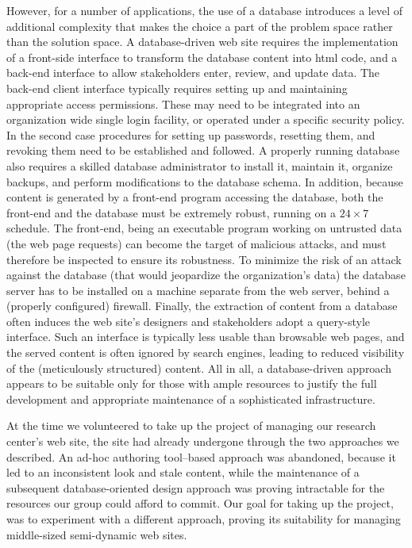 \documentclass[10pt]{article}
\begin{document}
However, for a number of applications, the use of a database
introduces a level of additional complexity that
makes the choice a part of
the problem space rather than the solution space.
A database-driven web site requires the implementation of a
front-side interface to transform the database content into
{\sc html} code, and a back-end interface to allow stakeholders
enter, review, and update data.
The back-end client interface typically requires setting up
and maintaining appropriate access permissions.
These may need to be integrated into an organization wide single
login facility, or operated under a specific security policy.
In the second case procedures for setting up passwords,
resetting them, and revoking them need to be established
and followed.
A properly running database also requires a skilled database
administrator to install it, maintain it, organize backups,
and perform modifications to the database schema.
In addition, because content is generated by a front-end
program accessing the database, both the front-end and the database
must be extremely robust, running on a $24 \times 7$ schedule.
The front-end, being an executable program working on
untrusted data (the web page requests) can become the target of
malicious attacks,
and must therefore be inspected to ensure its robustness.
To minimize the risk of an attack against the database
(that would jeopardize the organization's data)
the database server has to be installed on a machine separate
from the web server, behind a (properly configured) firewall.
Finally, the extraction of content from a database often
induces the web site's designers and stakeholders adopt a
query-style interface.
Such an interface is typically less usable than browsable web pages,
and the served content is often ignored by search engines,
leading to reduced visibility
of the (meticulously structured) content.
All in all, a database-driven approach appears to be suitable
only for those with ample resources to justify the full
development and appropriate maintenance of a sophisticated infrastructure.

At the time we volunteered to take up the project of managing our
research center's web site, the site had already undergone through
the two approaches we described.
An ad-hoc authoring tool--based approach was abandoned,
because it led to an inconsistent look and stale content,
while the maintenance of a subsequent database-oriented
design approach was proving intractable for the resources
our group could afford to commit.
Our goal for taking up the project, was to experiment with a
different approach,
proving its suitability for managing middle-sized semi-dynamic
web sites.
\end{document}
